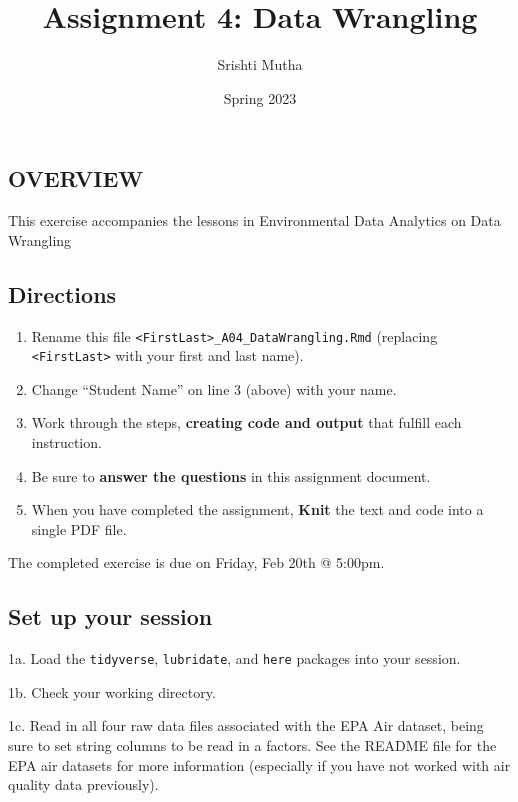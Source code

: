 \documentclass[
]{article}
\title{Assignment 4: Data Wrangling}
\author{Srishti Mutha}
\date{Spring 2023}
\providecommand{\tightlist}{%
  \setlength{\itemsep}{0pt}\setlength{\parskip}{0pt}}
\begin{document}
\maketitle

\hypertarget{overview}{%
\subsection{OVERVIEW}\label{overview}}

This exercise accompanies the lessons in Environmental Data Analytics on
Data Wrangling

\hypertarget{directions}{%
\subsection{Directions}\label{directions}}

\begin{enumerate}
\def\labelenumi{\arabic{enumi}.}
\tightlist
\item
  Rename this file
  \texttt{\textless{}FirstLast\textgreater{}\_A04\_DataWrangling.Rmd}
  (replacing \texttt{\textless{}FirstLast\textgreater{}} with your first
  and last name).
\item
  Change ``Student Name'' on line 3 (above) with your name.
\item
  Work through the steps, \textbf{creating code and output} that fulfill
  each instruction.
\item
  Be sure to \textbf{answer the questions} in this assignment document.
\item
  When you have completed the assignment, \textbf{Knit} the text and
  code into a single PDF file.
\end{enumerate}

The completed exercise is due on Friday, Feb 20th @ 5:00pm.

\hypertarget{set-up-your-session}{%
\subsection{Set up your session}\label{set-up-your-session}}

1a. Load the \texttt{tidyverse}, \texttt{lubridate}, and \texttt{here}
packages into your session.

1b. Check your working directory.

1c. Read in all four raw data files associated with the EPA Air dataset,
being sure to set string columns to be read in a factors. See the README
file for the EPA air datasets for more information (especially if you
have not worked with air quality data previously).
\end{document}
